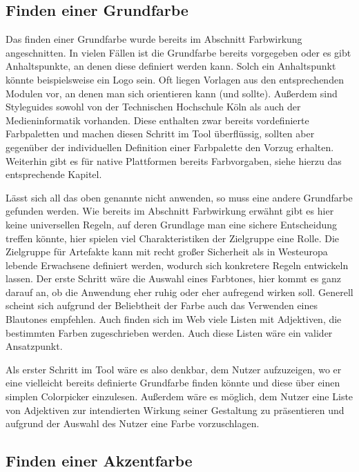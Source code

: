 \subsection{Finden einer Grundfarbe}

Das finden einer Grundfarbe wurde bereits im Abschnitt Farbwirkung angeschnitten. In vielen Fällen ist die Grundfarbe bereits vorgegeben oder es gibt Anhaltspunkte, an denen diese definiert werden kann. Solch ein Anhaltspunkt könnte beispielsweise ein Logo sein.
Oft liegen Vorlagen aus den entsprechenden Modulen vor, an denen man sich orientieren kann (und sollte). Außerdem sind Styleguides sowohl von der Technischen Hochschule Köln als  auch der Medieninformatik vorhanden. Diese enthalten zwar bereits vordefinierte Farbpaletten und machen diesen Schritt im Tool überflüssig, sollten aber gegenüber der individuellen Definition einer Farbpalette den Vorzug erhalten. Weiterhin gibt es für native Plattformen bereits Farbvorgaben, siehe hierzu das entsprechende Kapitel.

Lässt sich all das oben genannte nicht anwenden, so muss eine andere Grundfarbe gefunden werden. Wie bereits im Abschnitt Farbwirkung erwähnt gibt es hier keine universellen Regeln, auf deren Grundlage man eine sichere Entscheidung treffen könnte, hier spielen viel Charakteristiken der Zielgruppe eine Rolle. Die Zielgruppe für Artefakte kann mit recht großer Sicherheit als in Westeuropa lebende Erwachsene definiert werden, wodurch sich konkretere Regeln entwickeln lassen.
Der erste Schritt wäre die Auswahl eines Farbtones, hier kommt es ganz darauf an, ob die Anwendung eher ruhig oder eher aufregend wirken soll. Generell scheint sich aufgrund der Beliebtheit der Farbe auch das Verwenden eines Blautones empfehlen.
Auch finden sich im Web viele Listen mit Adjektiven, die bestimmten Farben zugeschrieben werden. Auch diese Listen wäre ein valider Ansatzpunkt.

Als erster Schritt im Tool wäre es also denkbar, dem Nutzer aufzuzeigen, wo er eine vielleicht bereits definierte Grundfarbe finden könnte und diese über einen simplen Colorpicker einzulesen.
Außerdem wäre es möglich, dem Nutzer eine Liste von Adjektiven zur intendierten Wirkung seiner Gestaltung zu präsentieren und aufgrund der Auswahl des Nutzer eine Farbe vorzuschlagen.

\subsection{Finden einer Akzentfarbe}

